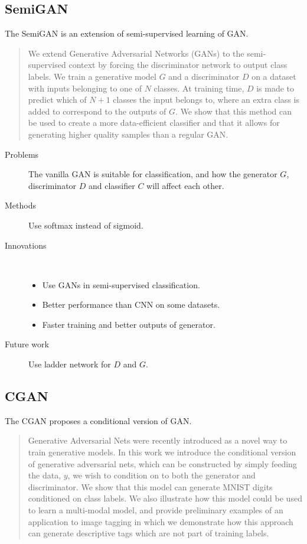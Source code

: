 \documentclass[12pt]{utils/mydoc}
\begin{document}
\subsection{SemiGAN}

The SemiGAN\cite{odena2016semi} is an extension of semi-supervised learning of GAN. 

\begin{abstract}
  We extend Generative Adversarial Networks (GANs) to the semi-supervised 
  context by forcing the discriminator network to output class labels. We
  train a generative model $G$ and a discriminator $D$ on a dataset with inputs
  belonging to one of $N$ classes. At training time, $D$ is made to predict 
  which of $N+1$ classes the input belongs to, where an extra class is added
  to correspond to the outputs of $G$. We show that this method can be used
  to create a more data-efficient classifier and that it allows for 
  generating higher quality samples than a regular GAN.
\end{abstract}

\begin{description}
  \item[Problems] The vanilla GAN is suitable for classification, and how the generator $G$, discriminator $D$ and classifier $C$ will affect each other.
  \item[Methods] Use softmax instead of sigmoid.
  \item[Innovations] ~
    \begin{itemize}
      \item Use GANs in semi-supervised classification.
      \item Better performance than CNN on some datasets.
      \item Faster training and better outputs of generator.
    \end{itemize}
  \item[Future work] Use ladder network for $D$ and $G$.
\end{description}

\subsection{CGAN}

The CGAN\cite{mirza2014conditional} proposes a conditional version of GAN.

\begin{abstract}
  Generative Adversarial Nets were recently introduced as a novel way to train
  generative models. In this work we introduce the conditional version of generative
  adversarial nets, which can be constructed by simply feeding the data, $y$, we wish
  to condition on to both the generator and discriminator. We show that this model
  can generate MNIST digits conditioned on class labels. We also illustrate how
  this model could be used to learn a multi-modal model, and provide preliminary
  examples of an application to image tagging in which we demonstrate how this
  approach can generate descriptive tags which are not part of training labels.
\end{abstract}
\end{document}
